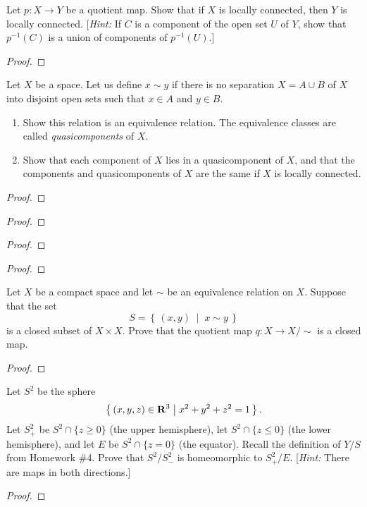 \begin{problem}[Munkres \S25, Ex.\,8]
Let $p\colon X\to Y$ be a quotient map. Show that if $X$ is
locally connected, then $Y$ is locally connected. [\emph{Hint:}
If $C$ is a component of the open set $U$ of $Y$, show that
$p^{-1}(C)$ is a union of components of $p^{-1}(U)$.]
\end{problem}
\begin{proof}
\end{proof}
\newpage
\begin{problem}[Munkres \S25, Ex.\,10(a,b)]
Let $X$ be a space. Let us define $x\sim y$ if there is no
separation $X=A\cup B$ of $X$ into disjoint open sets such that
$x\in A$ and $y\in B$.
\begin{enumerate}[noitemsep,label=(\alph*)]
\item Show this relation is an equivalence relation. The
  equivalence classes are called \emph{quasicomponents} of $X$.
\item Show that each component of $X$ lies in a quasicomponent of
  $X$, and that the components and quasicomponents of $X$ are the
  same if $X$ is locally connected.
\end{enumerate}
\end{problem}
\begin{proof}
\end{proof}
\newpage
\begin{problem}[Munkres \S26, Ex.\,4]

\end{problem}
\begin{proof}
\end{proof}
\newpage
\begin{problem}[Munkres \S26, Ex.\,5]
\end{problem}
\begin{proof}
\end{proof}
\newpage
\begin{problem}[Munkres \S26, Ex.\,7]
\end{problem}
\begin{proof}
\end{proof}
\newpage
\begin{problem}[A]
Let $X$ be a compact space and let $\sim$ be an equivalence
relation on $X$. Suppose that the set
\[
S=\left\{\,(x,y)\;\middle|\;x\sim y\,\right\}
\]
is a closed subset of $X\times X$. Prove that the quotient map
$q\colon X\to X/{\sim}$ is a closed map.
\end{problem}
\begin{proof}
\end{proof}
\newpage
\begin{problem}[B]
Let $S^2$ be the sphere
\[
\left\{\,(x,y,z)\in\mathbf{R}^3\;\middle|\;x^2+y^2+z^2=1\,\right\}.
\]
Let $S_+^2$ be $S^2\cap\{z\geq 0\}$ (the upper hemisphere), let
$S^2\cap\{z\leq 0\}$ (the lower hemisphere), and let $E$ be
$S^2\cap\{z=0\}$ (the equator). Recall the definition of $Y/S$
from Homework \#4. Prove that $S^2/S^2_-$ is homeomorphic to
$S_+^2/E$. [\emph{Hint:} There are maps in both directions.]
\end{problem}
\begin{proof}
\end{proof}

